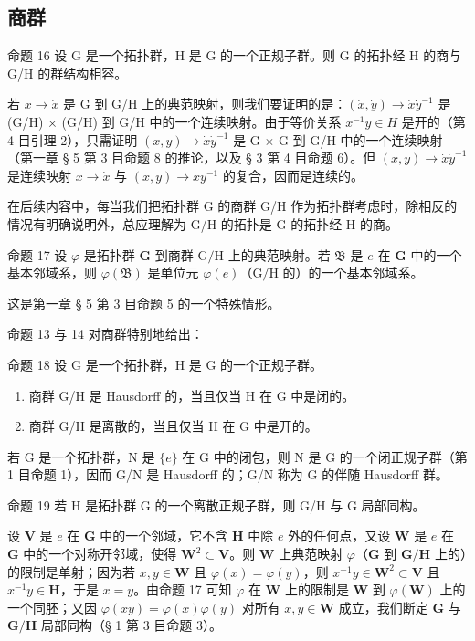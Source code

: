 \subsection{商群}

命题 16 设 G 是一个拓扑群，H 是 G 的一个正规子群。则 G 的拓扑经 H 的商与 G/H 的群结构相容。

若 \(x \to \dot{x}\) 是 G 到 G/H 上的典范映射，则我们要证明的是：\((\dot{x}, \dot{y}) \to \dot{x}\dot{y}^{-1}\) 是 (G/H) \(\times\) (G/H) 到 G/H 中的一个连续映射。由于等价关系 \(x^{-1}y \in H\) 是开的（第 4 目引理 2），只需证明 \((x,y) \to \dot{x}\dot{y}^{-1}\) 是 G \(\times\) G 到 G/H 中的一个连续映射（第一章 § 5 第 3 目命题 8 的推论，以及 § 3 第 4 目命题 6）。但 \((x,y) \to \dot{x}\dot{y}^{-1}\) 是连续映射 \(x \to \dot{x}\) 与 \((x,y) \to xy^{-1}\) 的复合，因而是连续的。

在后续内容中，每当我们把拓扑群 G 的商群 G/H 作为拓扑群考虑时，除相反的情况有明确说明外，总应理解为 G/H 的拓扑是 G 的拓扑经 H 的商。

命题 17 设 \(\varphi\) 是拓扑群 \(\mathbf{G}\) 到商群 \(\mathrm{G / H}\) 上的典范映射。若 \(\mathfrak{B}\) 是 \(e\) 在 \(\mathbf{G}\) 中的一个基本邻域系，则 \(\varphi(\mathfrak{B})\) 是单位元 \(\varphi(e)\)（\(\mathrm{G / H}\) 的）的一个基本邻域系。

这是第一章 § 5 第 3 目命题 5 的一个特殊情形。

命题 13 与 14 对商群特别地给出：

命题 18 设 G 是一个拓扑群，H 是 G 的一个正规子群。

\begin{enumerate}
\def\labelenumi{\alph{enumi})}
\item
  商群 G/H 是 Hausdorff 的，当且仅当 H 在 G 中是闭的。
\item
  商群 G/H 是离散的，当且仅当 H 在 G 中是开的。
\end{enumerate}

若 G 是一个拓扑群，N 是 \(\{e\}\) 在 G 中的闭包，则 N 是 G 的一个闭正规子群（第 1 目命题 1），因而 G/N 是 Hausdorff 的；G/N 称为 G 的伴随 Hausdorff 群。

命题 19 若 H 是拓扑群 G 的一个离散正规子群，则 G/H 与 G 局部同构。

设 \(\mathbf{V}\) 是 \(e\) 在 \(\mathbf{G}\) 中的一个邻域，它不含 \(\mathbf{H}\) 中除 \(e\) 外的任何点，又设 \(\mathbf{W}\) 是 \(e\) 在 \(\mathbf{G}\) 中的一个对称开邻域，使得 \(\mathbf{W}^2 \subset \mathbf{V}\)。则 \(\mathbf{W}\) 上典范映射 \(\varphi\)（\(\mathbf{G}\) 到 \(\mathbf{G} / \mathbf{H}\) 上的）的限制是单射；因为若 \(x, y \in \mathbf{W}\) 且 \(\varphi(x) = \varphi(y)\)，则 \(x^{-1}y \in \mathbf{W}^2 \subset \mathbf{V}\) 且 \(x^{-1}y \in \mathbf{H}\)，于是 \(x = y\)。由命题 17 可知 \(\varphi\) 在 \(\mathbf{W}\) 上的限制是 \(\mathbf{W}\) 到 \(\varphi(\mathbf{W})\) 上的一个同胚；又因 \(\varphi(xy) = \varphi(x)\varphi(y)\) 对所有 \(x, y \in \mathbf{W}\) 成立，我们断定 \(\mathbf{G}\) 与 \(\mathbf{G} / \mathbf{H}\) 局部同构（§ 1 第 3 目命题 3）。

